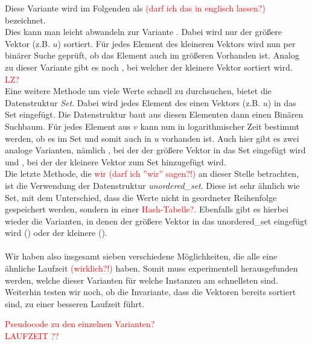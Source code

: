 Diese Variante wird im Folgenden als \SorSor \textcolor{red}{(darf ich das in
englisch lassen?)} bezeichnet.
\\
Dies kann man leicht abwandeln zur Variante \SorSea. Dabei wird nur der größere Vektor (z.B. $u$)
sortiert.
Für jedes Element des kleineren Vektors wird nun per binärer Suche geprüft, ob das Element auch im 
größeren Vorhanden ist. Analog zu dieser Variante gibt es noch \SeaSor, bei welcher 
der kleinere Vektor sortiert wird. \textcolor{red}{LZ?}
\\
Eine weitere Methode um  viele Werte schnell zu durchsuchen, bietet die Datenstruktur \textit{Set}.
Dabei wird jedes Element des einen Vektors (z.B. $u$) in das Set eingefügt. Die Datenstruktur
baut aus diesen Elementen dann einen Binären Suchbaum. Für jedes Element aus $v$ kann nun in logarithmischer
Zeit bestimmt werden, ob es im Set und somit auch in $u$ vorhanden ist. Auch hier gibt es zwei
analoge Varianten, nämlich \SetSea, bei der der größere Vektor in das Set eingefügt wird
und \SeaSet, bei der der kleinere Vektor zum Set hinzugefügt wird.
\\
Die letzte Methode, die \textcolor{red}{wir (darf ich ''wir'' sagen?!)} an dieser Stelle betrachten,
ist die Verwendung der Datenstruktur \textit{unordered\_set}. Diese ist sehr ähnlich wie Set, mit
dem Unterschied, dass die Werte nicht in geordneter Reihenfolge gespeichert werden, sondern
in einer \textcolor{red}{Hash-Tabelle?}. Ebenfalls gibt es hierbei wieder die Varianten, 
in denen der größere Vektor in das unordered\_set eingefügt wird (\USetSea) 
oder der kleinere (\SeaUSet).
\\
\\
Wir haben also insgesamt sieben verschiedene Möglichkeiten, die alle eine ähnliche Laufzeit \textcolor{red}{(wirklich?!)}
haben. Somit muss experimentell herausgefunden werden, welche dieser Varianten für welche Instanzen am
schnellsten sind. Weiterhin testen wir noch, ob die Invariante, dass die Vektoren bereits 
sortiert sind, zu einer besseren Laufzeit führt.


\textcolor{red}{Pseudocode zu den einzelnen Varianten?}\\
\textcolor{red}{LAUFZEIT ??}




